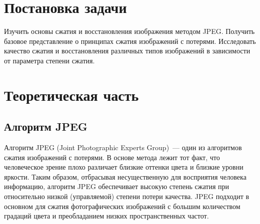 \documentclass[12pt,a4paper]{article}
\begin{document}
    

    \tableofcontents

    \clearpage


    \section{Постановка задачи}

        Изучить основы сжатия и восстановления изображения методом JPEG. Получить базовое представление о принципах сжатия изображений с потерями. Исследовать качество сжатия и восстановления различных типов изображений в зависимости от параметра степени сжатия.


    \section{Теоретическая часть}


        \subsection{Алгоритм JPEG}

            Алгоритм JPEG (Joint Photographic Experts Group)~--- один из алгоритмов сжатия изображений с потерями. В основе метода лежит тот факт, что человеческое зрение плохо различает близкие оттенки цвета и близкие уровни яркости. Таким образом, отбрасывая несущественную для восприятия человека информацию, алгоритм JPEG обеспечивает высокую степень сжатия при относительно низкой (управляемой) степени потери качества. JPEG подходит в основном для сжатия фотографических изображений с большим количеством градаций цвета и преобладанием низких пространственных частот.
\end{document}
